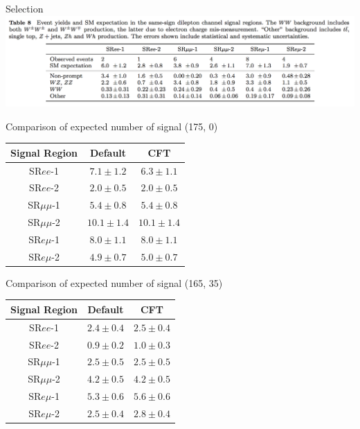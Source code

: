 \documentclass[mathserif,serif]{beamer}
\begin{document}


\begin{frame}{Selection}
\includegraphics[width=\textwidth]{data/photo/expNrun1.png}
\end{frame}




\begin{frame}{Comparison of expected number of signal (175, 0)}
\begin{tabular}{|c|c|c|}
\hline
Signal Region & Default & CFT \\
\hline
SR$ee$-1     & $7.1\pm1.2$ & $6.3\pm1.1$ \\
\hline
SR$ee$-2     & $2.0\pm0.5$ & $2.0\pm0.5$ \\
\hline
SR$\mu\mu$-1 & $5.4\pm0.8$ & $5.4\pm0.8$ \\
\hline
SR$\mu\mu$-2 & $10.1\pm1.4$ & $10.1\pm1.4$ \\
\hline
SR$e\mu$-1   & $8.0\pm1.1$ & $8.0\pm1.1$ \\
\hline
SR$e\mu$-2   & $4.9\pm0.7$ & $5.0\pm0.7$ \\
\hline
\end{tabular}
\end{frame}

\begin{frame}{Comparison of expected number of signal (165, 35)}
\begin{tabular}{|c|c|c|}
\hline
Signal Region & Default & CFT \\
\hline
SR$ee$-1     & $2.4\pm0.4$ & $2.5\pm0.4$ \\
\hline
SR$ee$-2     & $0.9\pm0.2$ & $1.0\pm0.3$ \\
\hline
SR$\mu\mu$-1 & $2.5\pm0.5$ & $2.5\pm0.5$ \\
\hline
SR$\mu\mu$-2 & $4.2\pm0.5$ & $4.2\pm0.5$ \\
\hline
SR$e\mu$-1   & $5.3\pm0.6$ & $5.6\pm0.6$ \\
\hline
SR$e\mu$-2   & $2.5\pm0.4$ & $2.8\pm0.4$ \\
\hline
\end{tabular}
\end{frame}
\end{document}
